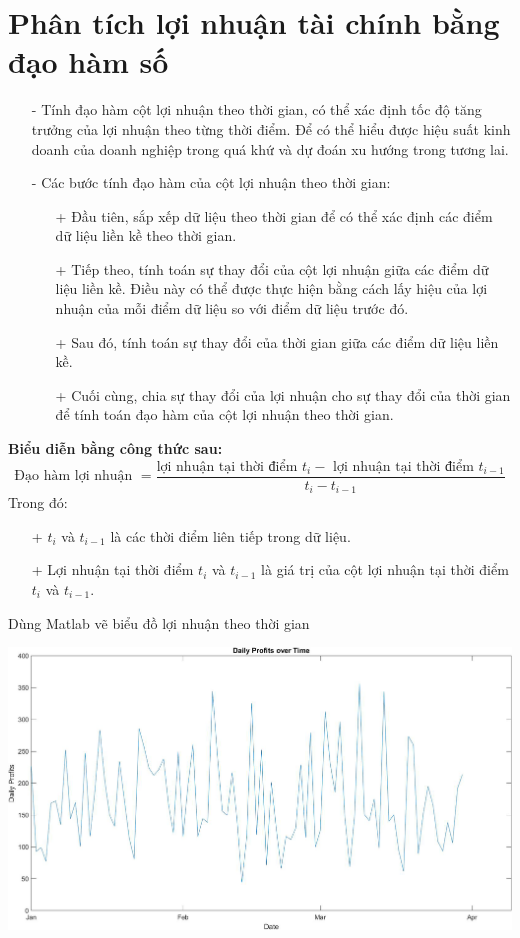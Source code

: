 \documentclass[12pt,a4paper]{report}
\begin{document}
\section{Phân tích lợi nhuận tài chính bằng đạo hàm số}
\begin{itemize}
    \item[-] Tính đạo hàm cột lợi nhuận theo thời gian, có thể xác định tốc độ tăng trưởng của lợi     nhuận theo từng thời điểm. Để có thể hiểu được hiệu suất kinh doanh của doanh nghiệp trong quá khứ và dự đoán xu hướng trong tương lai.
    \item[-] Các bước tính đạo hàm của cột lợi nhuận theo thời gian:
        \begin{itemize}
            \item[+]Đầu tiên, sắp xếp dữ liệu theo thời gian để có thể xác định các điểm dữ liệu liền kề theo thời gian.
            \item[+] Tiếp theo, tính toán sự thay đổi của cột lợi nhuận giữa các điểm dữ liệu liền kề. Điều này có thể được thực hiện bằng cách lấy hiệu của lợi nhuận của mỗi điểm dữ liệu so với điểm dữ liệu trước đó.
            \item[+] Sau đó, tính toán sự thay đổi của thời gian giữa các điểm dữ liệu liền kề.
            \item[+] Cuối cùng, chia sự thay đổi của lợi nhuận cho sự thay đổi của thời gian để tính toán đạo hàm của cột lợi nhuận theo thời gian.
        \end{itemize}
\end{itemize}
\textbf{Biểu diễn bằng công thức sau:}
\[
    \text{Đạo hàm lợi nhuận } = \frac{\text{lợi nhuận tại thời điểm }t_i - \text{ lợi nhuận tại thời điểm }t_{i-1}}{t_i - t_{i-1}}    
\]
Trong đó:
\begin{itemize}
    \item[+] $t_{i}$ và $t_{i-1}$ là các thời điểm liên tiếp trong dữ liệu.
    \item[+] Lợi nhuận tại thời điểm $t_{i}$ và $t_{i-1}$ là giá trị của cột lợi nhuận tại thời điểm $t_{i}$ và $t_{i-1}$.
\end{itemize}
Dùng Matlab vẽ biểu đồ lợi nhuận theo thời gian
\begin{center}
    \includegraphics[scale = 0.25]{fig1.png}
\end{center}
\end{document}
